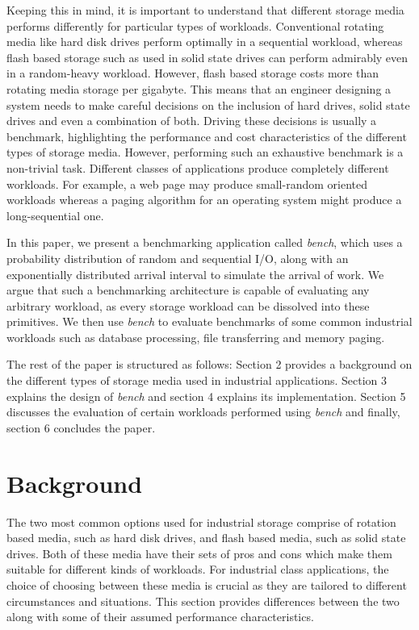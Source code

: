 \documentclass[10pt, author, twocolumn]{article}
\begin{document}
Keeping this in mind, it is important to understand that different storage media performs differently for particular types of workloads. Conventional rotating media like hard disk drives perform optimally in a sequential workload, whereas flash based storage such as used in solid state drives can perform admirably even in a random-heavy workload. However, flash based storage costs more than rotating media storage per gigabyte. This means that an engineer designing a system needs to make careful decisions on the inclusion of hard drives, solid state drives and even a combination of both. Driving these decisions is usually a benchmark, highlighting the performance and cost characteristics of the different types of storage media. However, performing such an exhaustive benchmark is a non-trivial task. Different classes of applications produce completely different workloads. For example, a web page may produce small-random oriented workloads whereas a paging algorithm for an operating system might produce a long-sequential one.

In this paper, we present a benchmarking application called \textit{bench}, which uses a probability distribution of random and sequential I/O, along with an exponentially distributed arrival interval to simulate the arrival of work. We argue that such a benchmarking architecture is capable of evaluating any arbitrary workload, as every storage workload can be dissolved into these primitives. We then use \textit{bench} to evaluate benchmarks of some common industrial workloads such as database processing, file transferring and memory paging. 

The rest of the paper is structured as follows: Section 2 provides a background on the different types of storage media used in industrial applications. Section 3 explains the design of \textit{bench} and section 4 explains its implementation. Section 5 discusses the evaluation of certain workloads performed using \textit{bench} and finally, section 6 concludes the paper.

\section{Background}

The two most common options used for industrial storage comprise of rotation based media, such as hard disk drives, and flash based media, such as solid state drives. Both of these media have their sets of pros and cons which make them suitable for different kinds of workloads. For industrial class applications, the choice of choosing between these media is crucial as they are tailored to different circumstances and situations. This section provides differences between the two along with some of their assumed performance characteristics. 
\end{document}
